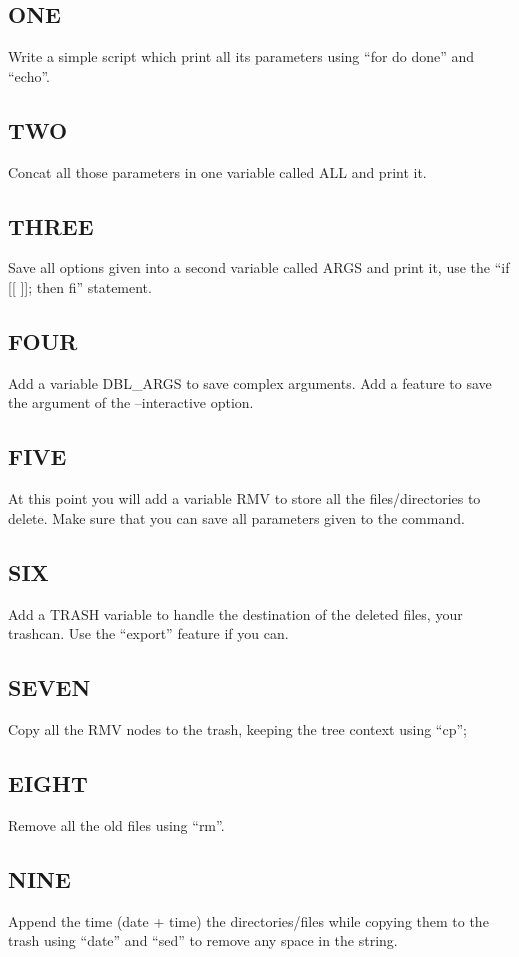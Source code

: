 \subsection{ONE}
Write a simple script which print all its parameters using ``for do done'' and ``echo''.

\subsection{TWO}
Concat all those parameters in one variable called ALL and print it.

\subsection{THREE}
Save all options given into a second variable called ARGS and print it, use the ``if [[ ]]; then fi'' statement.

\subsection{FOUR}
Add a variable DBL_ARGS  to save complex arguments.
Add a feature to save the argument of the --interactive option.

\subsection{FIVE}
At this point you will add a variable RMV to store all the files/directories to delete.
Make sure that you can save all parameters given to the command.

\subsection{SIX}
Add a TRASH variable to handle the destination of the deleted files, your trashcan.
Use the ``export'' feature if you can.

\subsection{SEVEN}
Copy all the RMV nodes to the trash, keeping the tree context using ``cp'';

\subsection{EIGHT}
Remove all the old files using ``rm''.

\subsection{NINE}
Append the time (date + time) the directories/files while copying them to the trash using ``date'' and ``sed'' to remove any space in the string.


